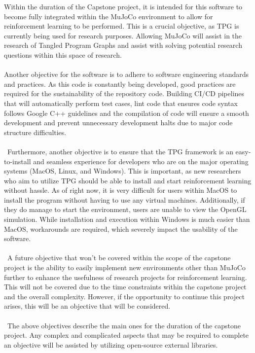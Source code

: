 \documentclass[12pt, titlepage]{article}
\begin{document}
Within the duration of the Capstone project, it is intended for this software to become fully integrated within the MuJoCo environment to allow for reinforcement learning to be performed. This is a crucial objective, as TPG is currently being used for research purposes. Allowing MuJoCo will assist in the research of Tangled Program Graphs and assist with solving potential research questions within this space of research. 
\\\\
Another objective for the software is to adhere to software engineering standards and practices. As this code is constantly being developed, good practices are required for the sustainability of the repository code. Building CI/CD pipelines that will automatically perform test cases, lint code that ensures code syntax follows Google C++ guidelines and the compilation of code will ensure a smooth development and prevent unnecessary development halts due to major code structure difficulties. 
\\\\\
Furthermore, another objective is to ensure that the TPG framework is an easy-to-install and seamless experience for developers who are on the major operating systems (MacOS, Linux, and Windows). This is important, as new researchers who aim to utilize TPG should be able to install and start reinforcement learning without hassle. As of right now, it is very difficult for users within MacOS to install the program without having to use any virtual machines. Additionally, if they do manage to start the environment, users are unable to view the OpenGL simulation. While installation and execution within Windows is much easier than MacOS, workarounds are required, which severely impact the usability of the software.
\\\\\
A future objective that won’t be covered within the scope of the capstone project is the ability to easily implement new environments other than MuJoCo further to enhance the usefulness of research projects for reinforcement learning. This will not be covered due to the time constraints within the capstone project and the overall complexity. However, if the opportunity to continue this project arises, this will be an objective that will be considered.
\\\\\
The above objectives describe the main ones for the duration of the capstone project. Any complex and complicated aspects that may be required to complete an objective will be assisted by utilizing open-source external libraries. 
\end{document}
